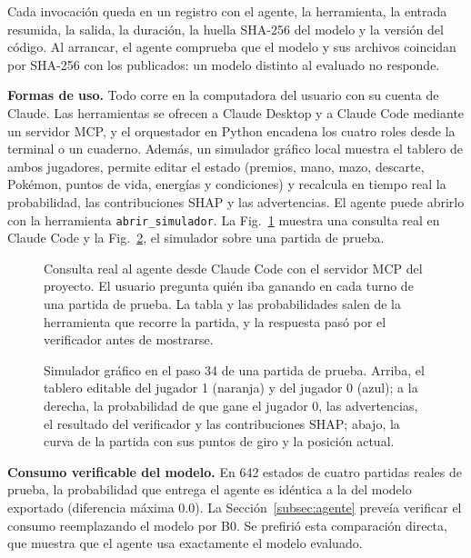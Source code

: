 Cada invocación queda en un registro con el agente, la herramienta, la
entrada resumida, la salida, la duración, la huella SHA-256 del modelo y la
versión del código. Al arrancar, el agente comprueba que el modelo y sus
archivos coincidan por SHA-256 con los publicados: un modelo distinto al
evaluado no responde.

\noindent\textbf{Formas de uso.} Todo corre en la computadora del usuario
con su cuenta de Claude. Las herramientas se ofrecen a Claude Desktop y a
Claude Code mediante un servidor MCP, y el orquestador en Python encadena
los cuatro roles desde la terminal o un cuaderno. Además, un simulador
gráfico local muestra el tablero de ambos jugadores, permite editar el
estado (premios, mano, mazo, descarte, Pok\'emon, puntos de vida, energías
y condiciones) y recalcula en tiempo real la probabilidad, las
contribuciones SHAP y las advertencias. El agente puede abrirlo con la
herramienta \texttt{abrir\_simulador}. La Fig.~\ref{fig:agenteclaude}
muestra una consulta real en Claude Code y la Fig.~\ref{fig:simulador}, el
simulador sobre una partida de prueba.

\begin{figure}[!t]
\centering
{}
\caption{Consulta real al agente desde Claude Code con el servidor MCP del
proyecto. El usuario pregunta quién iba ganando en cada turno de una
partida de prueba. La tabla y las probabilidades salen de la herramienta
que recorre la partida, y la respuesta pasó por el verificador antes de
mostrarse.}
\label{fig:agenteclaude}
\end{figure}

\begin{figure}[!t]
\centering
{}
\caption{Simulador gráfico en el paso 34 de una partida de prueba. Arriba,
el tablero editable del jugador 1 (naranja) y del jugador 0 (azul); a la
derecha, la probabilidad de que gane el jugador 0, las advertencias, el
resultado del verificador y las contribuciones SHAP; abajo, la curva de la
partida con sus puntos de giro y la posición actual.}
\label{fig:simulador}
\end{figure}

\noindent\textbf{Consumo verificable del modelo.} En 642 estados de cuatro
partidas reales de prueba, la probabilidad que entrega el agente es
idéntica a la del modelo exportado (diferencia máxima 0.0). La
Sección~\ref{subsec:agente} preveía verificar el consumo reemplazando el
modelo por B0. Se prefirió esta comparación directa, que muestra que el
agente usa exactamente el modelo evaluado.


